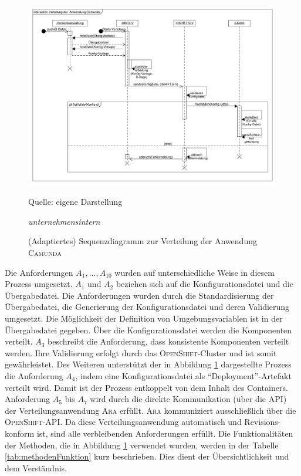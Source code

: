 \begin{figure}[h!]
	\centering
	\includegraphics[scale=0.39]{img/prozessDeploymentCamunda.pdf}
	\caption{(Adaptiertes) Sequenzdiagramm zur Verteilung der Anwendung \textsc{Camunda}}
	{\footnotesize Quelle: eigene Darstellung \par \textit{unternehmensintern}}
	\label{abb:prozessDeploymentCamunda}
\end{figure}
Die Anforderungen $A_{1}, ..., A_{10}$ wurden auf unterschiedliche Weise in diesem Prozess umgesetzt. $A_{1}$ und $A_{2}$ beziehen sich auf die Konfigurationsdatei und die Übergabedatei. Die Anforderungen wurden durch die Standardisierung der Übergabedatei, die Generierung der Konfigurationsdatei und deren Validierung umgesetzt. Die Möglichkeit der Definition von Umgebungsvariablen ist in der Übergabedatei gegeben. Über die Konfigurationsdatei werden die Komponenten verteilt. $A_{3}$ beschreibt die Anforderung, dass konsistente Komponenten verteilt werden. Ihre Validierung erfolgt durch das \textsc{OpenShift}-Cluster und ist somit gewährleistet. Des Weiteren unterstützt der in Abbildung \ref{abb:prozessDeploymentCamunda} dargestellte Prozess die Anforderung $A_{4}$, indem eine Konfigurationsdatei als \enquote{Deployment}-Artefakt verteilt wird. Damit ist der Prozess entkoppelt von dem Inhalt des Containers. Anforderung $A_{5}$ bis $A_{7}$ wird durch die direkte Kommunikation (über die \ac{API}) der Verteilungsanwendung \textsc{Ara} erfüllt. \textsc{Ara} kommuniziert ausschließlich über die \textsc{OpenShift}-\ac{API}. Da diese Verteilungsanwendung automatisch und Revisions-konform ist, sind alle verbleibenden Anforderungen erfüllt. Die Funktionalitäten der Methoden, die in Abbildung \ref{abb:prozessDeploymentCamunda} verwendet wurden, werden in der Tabelle \ref{tab:methodenFunktion} kurz beschrieben. Dies dient der Übersichtlichkeit und dem Verständnis. 

